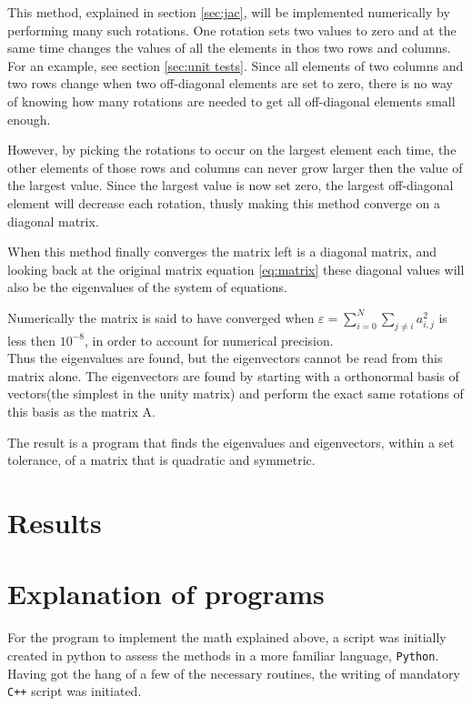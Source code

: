 \documentclass[11pt,a4paper,notitlepage]{article}
\begin{document}
This method, explained in section \ref{sec:jac}, will be implemented numerically by performing many such rotations. One rotation sets two values to zero and at the same time changes the values of all the elements in thos two rows and columns. For an example, see section \ref{sec:unit tests}. Since all elements of two columns and two rows change when two off-diagonal elements are set to zero, there is no way of knowing how many rotations are needed to get all off-diagonal elements small enough.

However, by picking the rotations to occur on the largest element each time,
the other elements of those rows and columns can never grow larger then the value of the largest value. Since the largest value is now set zero, the largest off-diagonal element will decrease each rotation, thusly making this method converge on a diagonal matrix. 

When this method finally converges the matrix left is a diagonal matrix, and looking back at the original matrix equation \eqref{eq:matrix} these diagonal values will also be the eigenvalues of the system of equations.

Numerically the matrix is said to have converged when $\varepsilon = \sum_{i=0}^N \sum_{j\neq i} a_{i,j}^2$ is less then $10^{-8}$, in order to account for numerical precision. \\

Thus the eigenvalues are found, but the eigenvectors cannot be read from this matrix alone. The eigenvectors are found by starting with a orthonormal basis of vectors(the simplest in the unity matrix) and perform the exact same rotations of this basis as the matrix A.

The result is a program that finds the eigenvalues and eigenvectors, within a set tolerance, of a matrix that is quadratic and symmetric.

\section{Results}




\section{Explanation of programs}
For the program to implement the math explained above, a script was initially created in python to assess the methods in a more familiar language, \verb|Python|. Having got the hang of a few of the necessary routines, the writing of mandatory \verb|C++| script was initiated.
\end{document}
